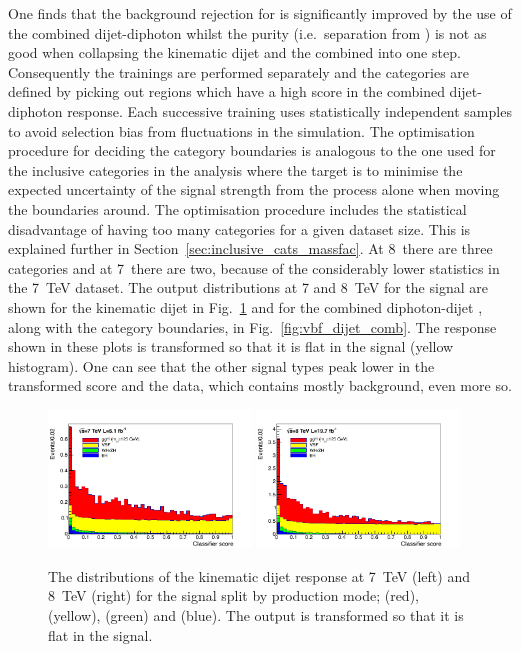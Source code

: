 One finds that the background rejection for \VBF is significantly improved by the use of the combined dijet-diphoton \BDT whilst the \VBF purity (i.e.~separation from \ggH) is not as good when collapsing the kinematic dijet \BDT and the combined \BDT into one step. Consequently the trainings are performed separately and the \VBF categories are defined by picking out regions which have a high score in the combined dijet-diphoton \BDT response. Each successive \BDT training uses statistically independent \MC samples to avoid selection bias from fluctuations in the simulation. The optimisation procedure for deciding the category boundaries is analogous to the one used for the inclusive categories in the \MFM analysis where the target is to minimise the expected uncertainty of the signal strength from the \VBF process alone when moving the boundaries around. The optimisation procedure includes the statistical disadvantage of having too many categories for a given dataset size. This is explained further in Section~\ref{sec:inclusive_cats_massfac}. At 8~\TeV there are three \VBF categories and at 7~\TeV there are two, because of the considerably lower statistics in the 7~TeV dataset. The output distributions at 7 and 8~TeV for the signal are shown for the kinematic dijet \BDT in Fig.~\ref{fig:vbf_dijet_kin} and for the combined diphoton-dijet \BDT, along with the \VBF category boundaries, in Fig.~\ref{fig:vbf_dijet_comb}. The \BDT response shown in these plots is transformed so that it is flat in the \VBF signal (yellow histogram). One can see that the other signal types peak lower in the transformed score and the data, which contains mostly background, even more so. 

\begin{figure}
  \includegraphics[width=0.48\textwidth]{selec_and_cats/plots/dijetbdt_transformed_signal_7TeV_fix_fix.pdf}
  \includegraphics[width=0.48\textwidth]{selec_and_cats/plots/dijetbdt_transformed_signal_8TeV_fix_fix.pdf} 
  \caption[The kinematic dijet \acs{BDT} response]{The distributions of the kinematic dijet \BDT response at 7~TeV (left) and 8~TeV (right) for the signal split by production mode; \ggH (red), \VBF (yellow), \VH (green) and \ttH (blue). The output is transformed so that it is flat in the \VBF signal.}
  \label{fig:vbf_dijet_kin}
\end{figure}

